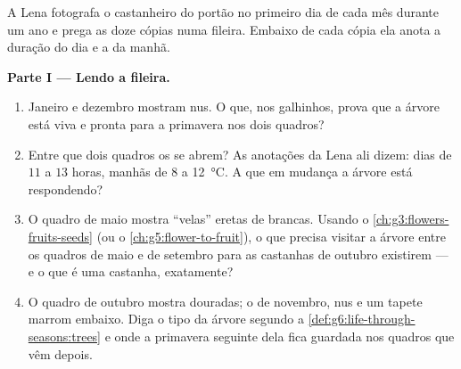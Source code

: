 \begin{problem}\label{pb:g6:life-through-seasons:1}
A Lena fotografa o castanheiro do portão no primeiro dia de cada mês
durante um ano e prega as doze cópias numa fileira. Embaixo de cada
cópia ela anota a duração do dia e a  da manhã.

\medskip\noindent\textbf{Parte I --- Lendo a fileira.}
\begin{enumerate}
  \item Janeiro e dezembro mostram  nus. O que, nos galhinhos,
        prova que a árvore está viva e pronta para a primavera nos
        dois quadros?
  \item Entre que dois quadros os  se abrem? As anotações da
        Lena ali dizem: dias de $11$ a $13$ horas, manhãs de $8$ a
        \qty{12}{\degreeCelsius}. A que  em mudança a
        árvore está respondendo?
  \item O quadro de maio mostra ``velas'' eretas de  brancas.
        Usando o \cref{ch:g3:flowers-fruits-seeds} (ou o
        \cref{ch:g5:flower-to-fruit}), o que precisa visitar a
        árvore entre os quadros de maio e de setembro para as
        castanhas de outubro existirem --- e o que é uma castanha,
        exatamente?
  \item O quadro de outubro mostra  douradas; o de novembro,
         nus e um tapete marrom embaixo. Diga o tipo da árvore
        segundo a \cref{def:g6:life-through-seasons:trees} e onde a
        primavera seguinte dela fica guardada nos quadros que vêm
        depois.
\end{enumerate}


\end{problem}
